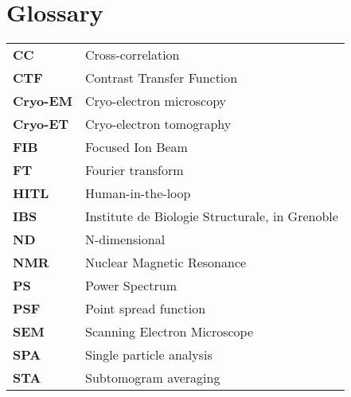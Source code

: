 \chapter{Glossary}


\begin{tabularx}{\linewidth}{@{}>{\bfseries}l X} %
CC & Cross-correlation \\
CTF & Contrast Transfer Function \\
Cryo-EM & Cryo-electron microscopy \\
Cryo-ET & Cryo-electron tomography \\
FIB & Focused Ion Beam \\
FT & Fourier transform \\
HITL & Human-in-the-loop \\
IBS & Institute de Biologie Structurale, in Grenoble \\
ND & N-dimensional \\
NMR & Nuclear Magnetic Resonance \\
PS & Power Spectrum \\
PSF & Point spread function \\
SEM & Scanning Electron Microscope \\
SPA & Single particle analysis \\
STA & Subtomogram averaging \\
\end{tabularx}

